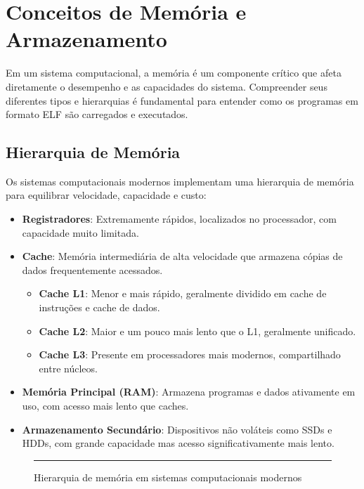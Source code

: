 \section{Conceitos de Memória e Armazenamento}\label{sec:memory_concepts}

Em um sistema computacional, a memória é um componente crítico que afeta diretamente o desempenho e as capacidades do sistema. Compreender seus diferentes tipos e hierarquias é fundamental para entender como os programas em formato ELF são carregados e executados.

\subsection{Hierarquia de Memória}\label{subsec:memory_hierarchy}

Os sistemas computacionais modernos implementam uma hierarquia de memória para equilibrar velocidade, capacidade e custo:

\begin{itemize}
    \item \textbf{Registradores}: Extremamente rápidos, localizados no processador, com capacidade muito limitada.
    \item \textbf{Cache}: Memória intermediária de alta velocidade que armazena cópias de dados frequentemente acessados.
        \begin{itemize}
            \item \textbf{Cache L1}: Menor e mais rápido, geralmente dividido em cache de instruções e cache de dados.
            \item \textbf{Cache L2}: Maior e um pouco mais lento que o L1, geralmente unificado.
            \item \textbf{Cache L3}: Presente em processadores mais modernos, compartilhado entre núcleos.
        \end{itemize}
    \item \textbf{Memória Principal (RAM)}: Armazena programas e dados ativamente em uso, com acesso mais lento que caches.
    \item \textbf{Armazenamento Secundário}: Dispositivos não voláteis como SSDs e HDDs, com grande capacidade mas acesso significativamente mais lento.
\end{itemize}

\begin{figure}[ht]
    \centering
    \rule{8cm}{6cm} %
    \caption{Hierarquia de memória em sistemas computacionais modernos}
    \label{fig:memory_hierarchy}
\end{figure}

